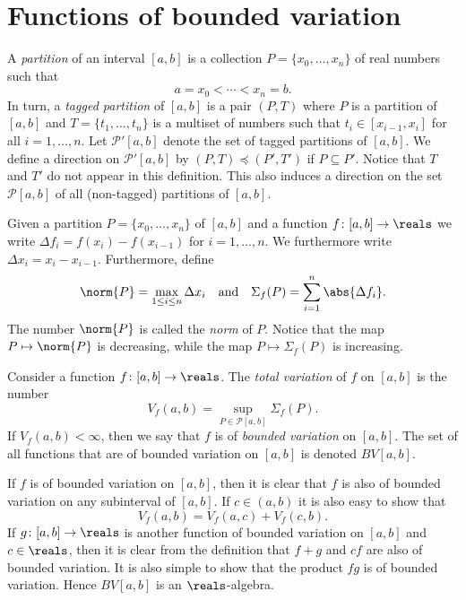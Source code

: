 \documentclass[article, a4paper, 11pt, oneside]{memoir}
\numberwithin{equation}{chapter}
\newcommand{\calP}{\mathcal{P}}
\newcommand{\calR}{\mathcal{R}}
\begin{document}
\section{Functions of bounded variation}

\newcommand{\boundedvar}[1]{\mathit{BV}[#1]}
\newcommand{\integrable}[2][]{\calR_{#1}[#2]}

A \emph{partition} of an interval $[a,b]$ is a collection $P = \{x_0, \ldots, x_n \}$ of real numbers such that
%
\begin{equation*}
    a = x_0 < \cdots < x_n = b.
\end{equation*}
%
In turn, a \emph{tagged partition} of $[a,b]$ is a pair $(P,T)$ where $P$ is a partition of $[a,b]$ and $T = \{t_1, \ldots, t_n\}$ is a multiset of numbers such that $t_i \in [x_{i-1}, x_i]$ for all $i = 1, \ldots, n$. Let $\calP'[a,b]$ denote the set of tagged partitions of $[a,b]$. We define a direction on $\calP'[a,b]$ by $(P,T) \preceq (P',T')$ if $P \subseteq P'$. Notice that $T$ and $T'$ do not appear in this definition. This also induces a direction on the set $\calP[a,b]$ of all (non-tagged) partitions of $[a,b]$.

Given a partition $P = \{x_0, \ldots, x_n \}$ of $[a,b]$ and a function $f \colon [a,b] \to \reals$ we write $\Delta f_i = f(x_i) - f(x_{i-1})$ for $i = 1, \ldots, n$. We furthermore write $\Delta x_i = x_i - x_{i-1}$. Furthermore, define
%
\begin{equation*}
    \norm{P}
        = \max_{1 \leq i \leq n} \Delta x_i
    \quad \text{and} \quad
    \Sigma_f(P)
        = \sum_{i=1}^n \abs{\Delta f_i}.
\end{equation*}
%
The number $\norm{P}$ is called the \emph{norm} of $P$. Notice that the map $P \mapsto \norm{P}$ is decreasing, while the map $P \mapsto \Sigma_f(P)$ is increasing.

\begin{definition}
    Consider a function $f \colon [a,b] \to \reals$. The \emph{total variation} of $f$ on $[a,b]$ is the number
    \begin{equation*}
        V_f(a,b)
            = \sup_{P \in \calP[a,b]} \Sigma_f(P).
    \end{equation*}
    If $V_f(a,b) < \infty$, then we say that $f$ is of \emph{bounded variation} on $[a,b]$. The set of all functions that are of bounded variation on $[a,b]$ is denoted $\boundedvar{a,b}$.
\end{definition}
%
If $f$ is of bounded variation on $[a,b]$, then it is clear that $f$ is also of bounded variation on any subinterval of $[a,b]$. If $c \in (a,b)$ it is also easy to show that
%
\begin{equation}
    \label{eq:total-variation-additive}
    V_f(a,b)
        = V_f(a,c) + V_f(c,b).
\end{equation}
%
If $g \colon [a,b] \to \reals$ is another function of bounded variation on $[a,b]$ and $c \in \reals$, then it is clear from the definition that $f + g$ and $cf$ are also of bounded variation. It is also simple to show that the product $fg$ is of bounded variation. Hence $\boundedvar{a,b}$ is an $\reals$-algebra.
\end{document}
